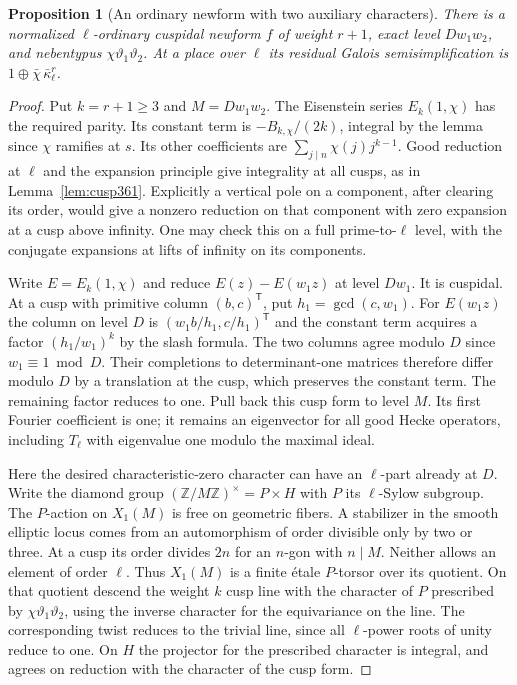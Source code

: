 \documentclass[a4paper,11pt]{article}
\newtheorem{proposition}{Proposition}[section]
\theoremstyle{definition}
\theoremstyle{remark}
\newcommand{\ZZ}{\mathbb Z}\newcommand{\ord}{\operatorname{ord}}
\numberwithin{equation}{section}
\begin{document}
\begin{proposition}[An ordinary newform with two auxiliary characters]\leavevmode
\label{prop:auxiliarycusp436}
There is a normalized \(\ell\)-ordinary cuspidal newform \(f\)
of weight \(r+1\), exact level \(D w_1w_2\), and nebentypus
\(\chi\vartheta_1\vartheta_2\). At a place over \(\ell\) its
residual Galois semisimplification is
\(1\oplus\bar\chi\,\bar\kappa_\ell^r\).
\end{proposition}
\begin{proof}
Put \(k=r+1\ge3\) and \(M=Dw_1w_2\). The Eisenstein series
\(E_k(1,\chi)\) has the required parity. Its constant term
is \(-B_{k,\chi}/(2k)\), integral by the lemma since \(\chi\)
ramifies at \(s\). Its other coefficients are
\(\sum_{j\mid n}\chi(j)j^{k-1}\). Good reduction at \(\ell\)
and the expansion principle give integrality at all cusps,
as in Lemma~\ref{lem:cusp361}. Explicitly a vertical pole
on a component, after clearing its order, would give a
nonzero reduction on that component with zero expansion at
a cusp above infinity. One may check this on a full
prime-to-\(\ell\) level, with the conjugate expansions at
lifts of infinity on its components.~\cite{XI-VIII-katz361,XI-VIII-billerey361}

Write \(E=E_k(1,\chi)\) and reduce \(E(z)-E(w_1z)\)
at level \(D w_1\). It is cuspidal. At a cusp with primitive
column \((b,c)^{\mathsf T}\), put \(h_1=\gcd(c,w_1)\).
For \(E(w_1z)\) the column on level \(D\) is
\((w_1b/h_1,c/h_1)^{\mathsf T}\) and the constant term
acquires a factor \((h_1/w_1)^k\) by the slash formula.
The two columns agree modulo \(D\) since \(w_1\equiv1\bmod D\).
Their completions to determinant-one matrices therefore differ
modulo \(D\) by a translation at the cusp, which preserves
the constant term. The remaining factor reduces to one.
Pull back this cusp form to level \(M\). Its first Fourier
coefficient is one; it remains an eigenvector for all good
Hecke operators, including \(T_\ell\) with eigenvalue one
modulo the maximal ideal.

Here the desired characteristic-zero character can have an
\(\ell\)-part already at \(D\). Write the diamond group
\((\ZZ/M\ZZ)^\times=P\times H\) with \(P\) its \(\ell\)-Sylow
subgroup. The \(P\)-action on \(X_1(M)\) is free on geometric
fibers. A stabilizer in the smooth elliptic locus comes
from an automorphism of order divisible only by two or three.
At a cusp its order divides \(2n\) for an \(n\)-gon with
\(n\mid M\). Neither allows an element of order \(\ell\).
Thus \(X_1(M)\) is a finite \'{e}tale \(P\)-torsor over its
quotient. On that quotient descend the weight \(k\) cusp
line with the character of \(P\) prescribed by
\(\chi\vartheta_1\vartheta_2\), using the inverse character
for the equivariance on the line. The corresponding twist
reduces to the trivial line, since all \(\ell\)-power roots
of unity reduce to one. On \(H\) the projector for the
prescribed character is integral, and agrees on reduction
with the character of the cusp form.


\end{proof}
\end{document}
